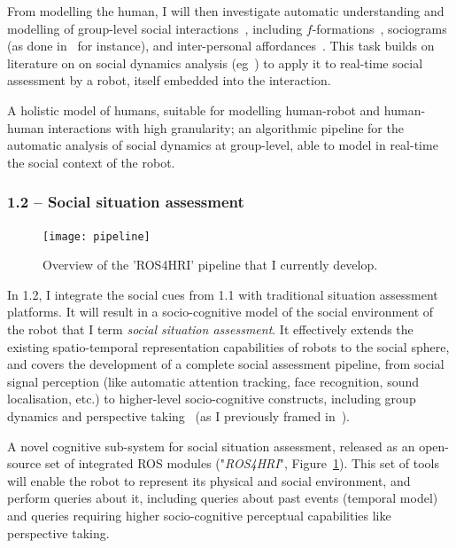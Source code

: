 From modelling the human, I will then investigate automatic understanding and
modelling of group-level social interactions~\parencite{tapus2019perceiving},
including $f$-formations~\parencite{marshall2011using}, sociograms (as done
in~\parencite{garcia2016hybrid} for instance), and inter-personal
affordances~\parencite{pandey2013affordance}. This task builds on literature on
on social dynamics analysis
(eg~\parencite{durantin2017social,jermann2009physical, martinez2019collocated})
to apply it to real-time social assessment by a robot, itself embedded into the
interaction.

\begin{outcome}{1.1}
    A holistic model of humans, suitable for modelling human-robot and
    human-human interactions with high granularity; an algorithmic pipeline for
    the automatic analysis of social dynamics at group-level, able to model in
    real-time the social context of the robot.
\end{outcome}


\subsubsection{1.2 -- Social situation assessment}

\begin{figure}
    \centering
    \texttt{[image: pipeline]}
    \caption{Overview of the 'ROS4HRI' pipeline that I currently develop.}
    \label{fig:ros4hri}
\end{figure}

In 1.2, I integrate the social
cues from 1.1 with traditional situation assessment platforms. It will
result in a socio-cognitive model of the social environment of the robot that I
term \emph{social situation assessment}. It effectively extends the
existing spatio-temporal representation capabilities of robots to the social
sphere, and covers the development of a complete social assessment pipeline,
from social signal perception (like automatic attention tracking, face
recognition, sound localisation, etc.) to higher-level socio-cognitive
constructs, including group dynamics and perspective
taking~\parencite{flavell1992perspectives} (as I previously framed
in~\parencite{lemaignan2015mutual, dillenbourg2016symmetry}).

\begin{outcome}{1.2}
A novel cognitive sub-system for social
    situation assessment, released as an open-source set of integrated ROS
    modules ("\emph{ROS4HRI}", Figure~\ref{fig:ros4hri}). This set of tools will enable the robot to
    represent its physical and social environment, and perform queries about it,
    including queries about past events (temporal model) and queries requiring
    higher socio-cognitive perceptual capabilities like perspective taking.
\end{outcome}


